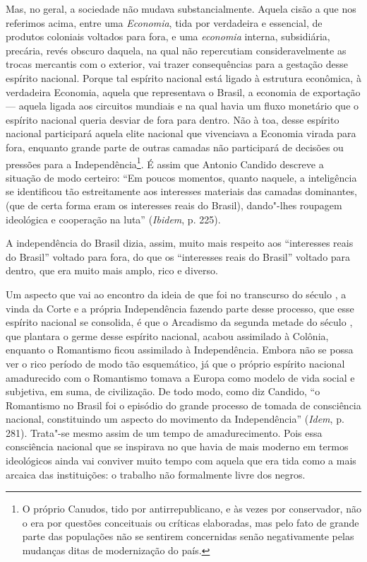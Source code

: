 Mas, no geral, a sociedade não mudava substancialmente. Aquela cisão a
que nos referimos acima, entre uma \emph{Economia}, tida por verdadeira
e essencial, de produtos coloniais voltados para fora, e uma
\emph{economia} interna, subsidiária, precária, revés obscuro daquela,
na qual não repercutiam consideravelmente as trocas mercantis com o
exterior, vai trazer consequências para a gestação desse espírito
nacional. Porque tal espírito nacional está ligado à estrutura
econômica, à verdadeira Economia, aquela que representava o Brasil, a
economia de exportação --- aquela ligada aos circuitos mundiais e na qual
havia um fluxo monetário que o espírito nacional queria desviar de fora
para dentro. Não à toa, desse espírito nacional participará aquela elite
nacional que vivenciava a Economia virada para fora, enquanto grande
parte de outras camadas não participará de decisões ou pressões para a
Independência\footnote{O próprio Canudos, tido por antirrepublicano, e
  às vezes por conservador, não o era por questões conceituais ou críticas elaboradas,
  mas pelo fato de grande parte das populações não se sentirem concernidas senão
  negativamente pelas mudanças ditas de modernização do país.}. É assim
que Antonio Candido descreve a situação de modo certeiro: ``Em poucos
momentos, quanto naquele, a inteligência se identificou tão
estreitamente aos interesses materiais das camadas dominantes, (que de
certa forma eram os interesses reais do Brasil), dando"-lhes roupagem
ideológica e cooperação na luta'' (\emph{Ibidem}, p. 225).

A independência do Brasil dizia, assim, muito mais respeito aos
``interesses reais do Brasil'' voltado para fora, do que os ``interesses
reais do Brasil'' voltado para dentro, que era muito mais amplo, rico e
diverso.

Um aspecto que vai ao encontro da ideia de que foi no transcurso do
século , a vinda da Corte e a própria Independência fazendo parte
desse processo, que esse espírito nacional se consolida, é que o
Arcadismo da segunda metade do século , que plantara o germe desse
espírito nacional, acabou assimilado à Colônia, enquanto o Romantismo
ficou assimilado à Independência. Embora não se possa ver o rico período
de modo tão esquemático, já que o próprio espírito nacional amadurecido
com o Romantismo tomava a Europa como modelo de vida social e subjetiva,
em suma, de civilização. De todo modo, como diz Candido, ``o Romantismo
no Brasil foi o episódio do grande processo de tomada de consciência
nacional, constituindo um aspecto do movimento da Independência''
(\emph{Idem}, p. 281). Trata"-se mesmo assim de um tempo de
amadurecimento. Pois essa consciência nacional que se inspirava no que
havia de mais moderno em termos ideológicos ainda vai conviver muito
tempo com aquela que era tida como a mais arcaica das instituições: o
trabalho não formalmente livre dos negros.

